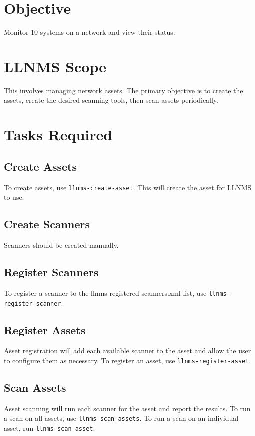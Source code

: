 \documentclass[12pt]{report}
\begin{document}
\section*{Objective}
Monitor 10 systems on a network and view their status.

\section*{LLNMS Scope}
This involves managing network assets.  The primary objective is to 
create the assets, create the desired scanning tools, then scan assets
periodically.

\section*{Tasks Required}

\subsection*{Create Assets}
To create assets, use \texttt{llnms-create-asset}.  This will create
the asset for LLNMS to use.

\subsection*{Create Scanners}
Scanners should be created manually.

\subsection*{Register Scanners}
To register a scanner to the llnms-registered-scanners.xml list, use
\texttt{llnms-register-scanner}.

\subsection*{Register Assets}
Asset registration will add each available scanner to the asset and allow the user to 
configure them as necessary. To register an asset, use \texttt{llnms-register-asset}.

\subsection*{Scan Assets}
Asset scanning will run each scanner for the asset and report the results.  To run a scan
on all assets, use \texttt{llnms-scan-assets}.  To run a scan on an individual asset, run
\texttt{llnms-scan-asset}. 
\end{document}
